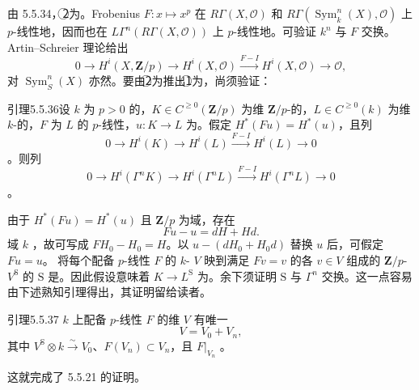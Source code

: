 由 5.5.34，\textcircled{2}为。Frobenius 
$F:x\mapsto x^p$ 在 $R\Gamma(X,\mathscr O)$ 和 $R\Gamma(\operatorname{Sym}^n_k(X),\mathscr O)$ 上 $p$-线性地，因而也在 $L\Gamma^n(R\Gamma(X,\mathscr O))$ 上 $p$-线性地。可验证 $k^n$ 与 $F$ 交换。
Artin--Schreier 理论给出
\[0\longrightarrow H^i(X,\mathbf Z/p)\longrightarrow H^i(X,\mathscr O)\xrightarrow{F-I}H^i(X,\mathscr O)\longrightarrow\mathscr O,\]
对 $\operatorname{Sym}^n_S(X)$ 亦然。要由\textcircled{2}为推出\textcircled{1}为，尚须验证：
\begin{SGAresult}{引理}{5.5.36}设 $k$ 为 $p>0$ 的，$K\in C^{\geq0}(\mathbf Z/p)$ 为维 $\mathbf Z/p$-的，$L\in C^{\geq0}(k)$ 为维 $k$-的，$F$ 为 $L$ 的 $p$-线性，$u:K\to L$ 为。假定 $H^*(Fu)=H^*(u)$，且列
\[0\longrightarrow H^i(K)\longrightarrow H^i(L)\xrightarrow{F-I}H^i(L)\longrightarrow0\]
。则列
\[0\longrightarrow H^i(\Gamma^nK)\longrightarrow H^i(\Gamma^nL)\xrightarrow{F-I}H^i(\Gamma^nL)\longrightarrow0\]
。
\end{SGAresult}
由于 $H^*(Fu)=H^*(u)$ 且 $\mathbf Z/p$ 为域，存在
\[Fu-u=dH+Hd.\]
域 $k$ ，故可写成 $FH_0-H_0=H$。以 $u-(dH_0+H_0d)$ 替换 $u$ 后，可假定 $Fu=u$。
将每个配备 $p$-线性 $F$ 的 $k$- $V$ 映到满足 $Fv=v$ 的各 $v\in V$ 组成的 $\mathbf Z/p$- $V^{\mathrm S}$ 的 $\mathrm S$ 是。因此假设意味着 $K\to L^{\mathrm S}$ 为。余下须证明 $\mathrm S$ 与 $\Gamma^n$ 交换。这一点容易由下述熟知引理得出，其证明留给读者。
\begin{SGAresult}{引理}{5.5.37} $k$ 上配备 $p$-线性 $F$ 的维 $V$ 有唯一
\[V=V_0+V_n,\]
其中 $V^{\mathrm S}\otimes k\xrightarrow\sim V_0$、$F(V_n)\subset V_n$，且 $F|_{V_n}$ 。
\end{SGAresult}
这就完成了 5.5.21 的证明。
